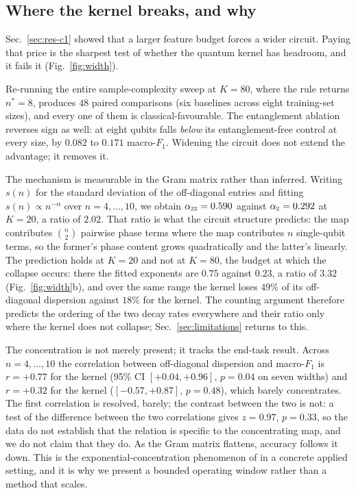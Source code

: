 \subsection{Where the kernel breaks, and why}
\label{sec:res-width}

\begin{revbody}


Sec.~\ref{sec:res-c1} showed that a larger feature budget forces a wider
circuit. Paying that price is the sharpest test of whether the quantum kernel
has headroom, and it fails it (Fig.~\ref{fig:width}).

Re-running the entire sample-complexity sweep at $K=80$, where the rule returns
$n^\ast=8$, produces $48$ paired comparisons (six baselines across eight
training-set sizes), and every one of them is classical-favourable. The
entanglement ablation reverses sign as well: at eight qubits \QSVM{} falls
\emph{below} its entanglement-free control at every size, by $0.082$ to $0.171$
macro-$F_1$. Widening the circuit does not extend the advantage; it removes it.

The mechanism is measurable in the Gram matrix rather than inferred. Writing
$s(n)$ for the standard deviation of the off-diagonal entries and fitting
$s(n)\propto n^{-\alpha}$ over $n=4,\dots,10$, we obtain $\alpha_{\textsc{zz}}=0.590$
against $\alpha_{\textsc{z}}=0.292$ at $K=20$, a ratio of $2.02$. That ratio is
what the circuit structure predicts: the \ZZ{} map contributes
$\binom{n}{2}$ pairwise phase terms where the \Zmap{} map contributes $n$
single-qubit terms, so the former's phase content grows quadratically and the
latter's linearly. The prediction holds at $K=20$ and not at $K=80$, the budget
at which the collapse occurs: there the fitted exponents are $0.75$ against
$0.23$, a ratio of $3.32$ (Fig.~\ref{fig:width}b), and over the same range the
\ZZ{} kernel loses $49\%$ of its off-diagonal dispersion against $18\%$ for the
\Zmap{} kernel. The counting argument therefore predicts the ordering of the
two decay rates everywhere and their ratio only where the kernel does not
collapse; Sec.~\ref{sec:limitations} returns to this.

The concentration is not merely present; it tracks the end-task result. Across
$n=4,\dots,10$ the correlation between off-diagonal dispersion and macro-$F_1$
is $r=+0.77$ for the \ZZ{} kernel (95\% CI $[+0.04,+0.96]$, $p=0.04$ on seven
widths) and $r=+0.32$ for the \Zmap{} kernel ($[-0.57,+0.87]$, $p=0.48$), which
barely concentrates. The first correlation is resolved, barely; the contrast
between the two is not: a test of the difference between the two correlations
gives $z=0.97$, $p=0.33$, so the data do not establish that the relation is
specific to the concentrating map, and we do not claim that they do. As the Gram
matrix flattens, accuracy follows it down.
This is the exponential-concentration phenomenon of \cite{thanasilp2024} in a
concrete applied setting, and it is why we present a bounded operating window
rather than a method that scales.


\end{revbody}
